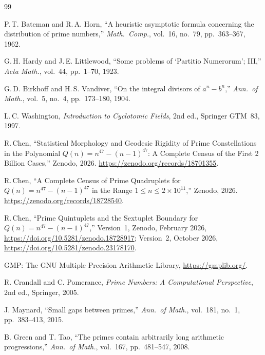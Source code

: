﻿\documentclass[11pt,a4paper]{article}
\begin{document}
\begin{thebibliography}{99}

P.\,T. Bateman and R.\,A. Horn,
``A heuristic asymptotic formula concerning the distribution of prime numbers,''
\textit{Math.\ Comp.}, vol.~16, no.~79, pp.~363--367, 1962.

G.\,H. Hardy and J.\,E. Littlewood,
``Some problems of `Partitio Numerorum'; III,''
\textit{Acta Math.}, vol.~44, pp.~1--70, 1923.

G.\,D. Birkhoff and H.\,S. Vandiver,
``On the integral divisors of $a^n - b^n$,''
\textit{Ann.\ of Math.}, vol.~5, no.~4, pp.~173--180, 1904.

L.\,C. Washington,
\textit{Introduction to Cyclotomic Fields}, 2nd ed., Springer GTM~83, 1997.

R.\,Chen,
``Statistical Morphology and Geodesic Rigidity of Prime Constellations in
the Polynomial $Q(n) = n^{47} - (n-1)^{47}$:
A Complete Census of the First 2 Billion Cases,''
Zenodo, 2026. \url{https://zenodo.org/records/18701355}.

R.\,Chen,
``A Complete Census of Prime Quadruplets for
$Q(n) = n^{47} - (n-1)^{47}$ in the Range $1 \leq n \leq 2 \times 10^{11}$,''
Zenodo, 2026. \url{https://zenodo.org/records/18728540}.

R.\,Chen,
``Prime Quintuplets and the Sextuplet Boundary for $Q(n) = n^{47} - (n-1)^{47}$,''
Version~1, Zenodo, February 2026, \url{https://doi.org/10.5281/zenodo.18728917};
Version~2, October 2026, \url{https://doi.org/10.5281/zenodo.23178170}.

GMP: The GNU Multiple Precision Arithmetic Library, \url{https://gmplib.org/}.

R. Crandall and C. Pomerance,
\textit{Prime Numbers: A Computational Perspective}, 2nd ed., Springer, 2005.

J. Maynard, ``Small gaps between primes,''
\textit{Ann.\ of Math.}, vol.~181, no.~1, pp.~383--413, 2015.

B. Green and T. Tao, ``The primes contain arbitrarily long arithmetic progressions,''
\textit{Ann.\ of Math.}, vol.~167, pp.~481--547, 2008.

\end{thebibliography}
\end{document}
